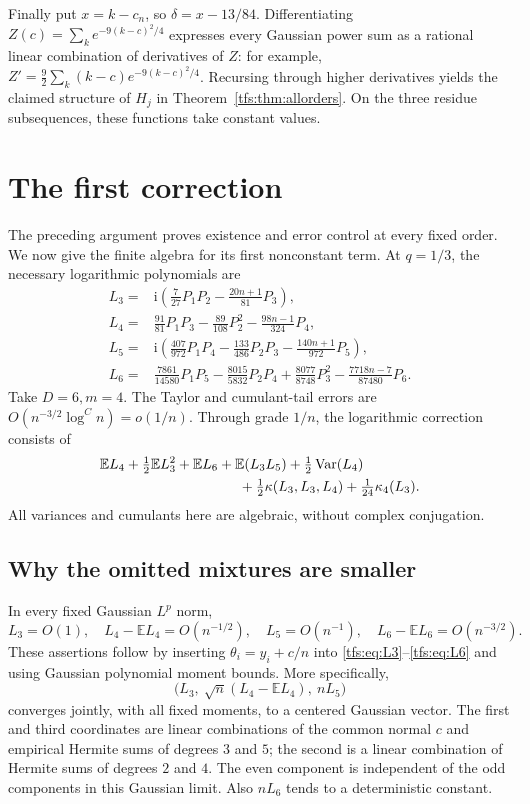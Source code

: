 \documentclass[11pt,a4paper]{article}
\numberwithin{equation}{section}
\theoremstyle{remark}
\newcommand{\E}{\mathbb E}
\newcommand{\1}{\mathbf 1}
\newcommand{\ii}{\mathrm i}
\newcommand{\Var}{\operatorname{Var}}
\begin{document}
Finally put $x=k-c_n$, so $\delta=x-13/84$.
Differentiating $Z(c)=\sum_k e^{-9(k-c)^2/4}$ expresses every Gaussian
power sum as a rational linear combination of derivatives of $Z$:
for example, $Z'=\tfrac92\sum_k(k-c)e^{-9(k-c)^2/4}$.
Recursing through higher derivatives yields the claimed structure of
$H_j$ in Theorem~\ref{tfs:thm:allorders}. On the three residue subsequences,
these functions take constant values.

\section{The first correction}\label{tfs:sec:first}
The preceding argument proves existence and error control at every fixed
order. We now give the finite algebra for its first nonconstant term.
At $q=1/3$, the necessary logarithmic polynomials are
\begin{align}
L_3={}&\ii\left(\frac7{27}P_1P_2-\frac{20n+1}{81}P_3\right),\label{tfs:eq:L3}\\
L_4={}&\frac{91}{81}P_1P_3-\frac{89}{108}P_2^2
                        -\frac{98n-1}{324}P_4,\label{tfs:eq:L4}\\
L_5={}&\ii\left(\frac{407}{972}P_1P_4-\frac{133}{486}P_2P_3
                        -\frac{140n+1}{972}P_5\right),\label{tfs:eq:L5}\\
L_6={}&\frac{7861}{14580}P_1P_5-\frac{8015}{5832}P_2P_4
       +\frac{8077}{8748}P_3^2-\frac{7718n-7}{87480}P_6.\label{tfs:eq:L6}
\end{align}
Take $D=6,m=4$. The Taylor and cumulant-tail errors are
$O(n^{-3/2}\log^C n)=o(1/n)$. Through grade $1/n$, the logarithmic
correction consists of
\begin{align}\label{tfs:eq:seven}
&\E L_4+\tfrac12\E L_3^2+\E L_6+\E(L_3L_5)
 +\tfrac12\Var(L_4)\notag\\
&\hspace{35mm}+\tfrac12\kappa(L_3,L_3,L_4)
                         +\tfrac1{24}\kappa_4(L_3).
\end{align}
All variances and cumulants here are algebraic, without complex
conjugation.

\subsection{Why the omitted mixtures are smaller}
In every fixed Gaussian $L^p$ norm,
\[
L_3=O(1),\quad L_4-\E L_4=O(n^{-1/2}),\quad
L_5=O(n^{-1}),\quad L_6-\E L_6=O(n^{-3/2}).
\]
These assertions follow by inserting $\theta_i=y_i+c/n$ into
\eqref{tfs:eq:L3}--\eqref{tfs:eq:L6} and using Gaussian polynomial moment bounds.
More specifically,
\[
\bigl(L_3,\ \sqrt n(L_4-\E L_4),\ nL_5\bigr)
\]
converges jointly, with all fixed moments, to a centered Gaussian vector.
The first and third coordinates are linear combinations of the common
normal $c$ and empirical Hermite sums of degrees $3$ and $5$; the second
is a linear combination of Hermite sums of degrees $2$ and $4$.
The even component is independent of the odd components in this
Gaussian limit. Also $nL_6$ tends to a deterministic constant.
\end{document}
